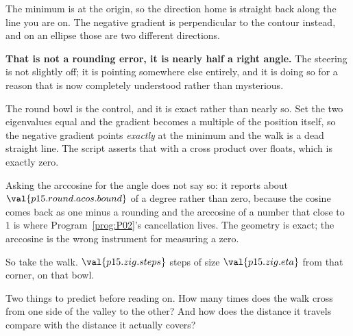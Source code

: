 \begin{fr}
The minimum is at the origin, so the direction home is straight back along the
line you are on. The negative gradient is perpendicular to the contour
instead, and on an ellipse those are two different directions.

\textbf{That is not a rounding error, it is nearly half a right angle.} The steering is not slightly off; it is pointing somewhere else
entirely, and it is doing so for a reason that is now completely understood
rather than mysterious.

\begin{note}
The round bowl is the control, and it is exact rather than nearly so. Set the
two eigenvalues equal and the gradient becomes a multiple of the position
itself, so the negative gradient points \emph{exactly} at the minimum and the
walk is a dead straight line. The script asserts that with a cross product
over floats, which is exactly zero.

Asking the arccosine for the angle does not say so: it reports about
$\val{p15.round.acos.bound}$ of a degree rather than zero, because the cosine
comes back as one minus a rounding and the arccosine of a number that close to
$1$ is where Program~\ref{prog:P02}'s cancellation lives. The geometry is
exact; the arccosine is the wrong instrument for measuring a zero.
\end{note}
\end{fr}

\begin{fr}
So take the walk. $\val{p15.zig.steps}$ steps of size $\val{p15.zig.eta}$
from that corner, on that bowl.

Two things to predict before reading on. How many times does the walk cross
from one side of the valley to the other? And how does the distance it travels
compare with the distance it actually covers?
\dotline
\nextframe
\end{fr}

